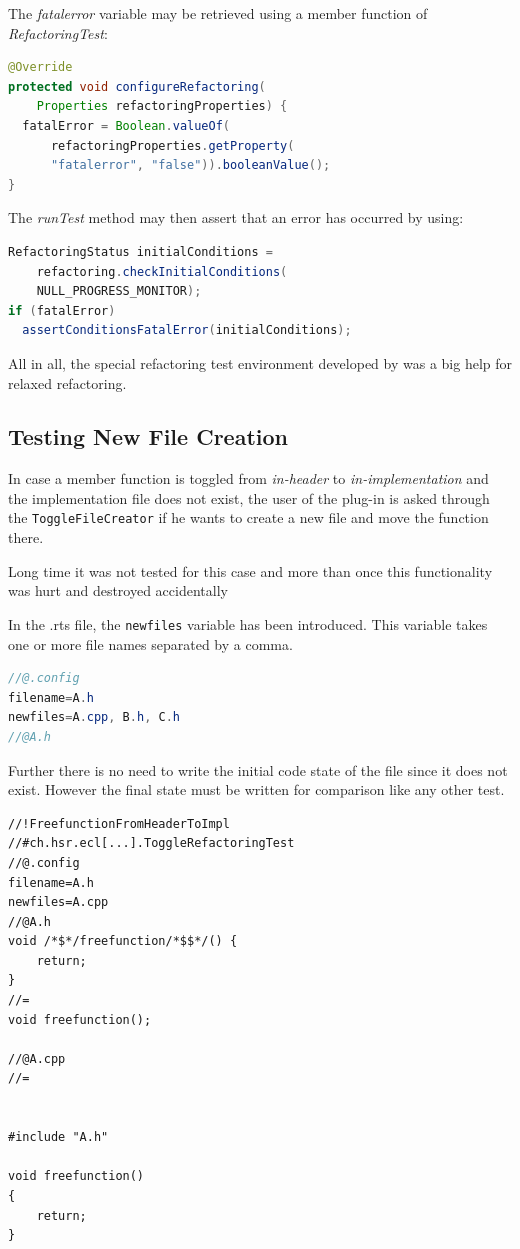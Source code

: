 The \textit{fatalerror} variable may be retrieved using a member function of \textit{RefactoringTest}:
\begin{lstlisting}[caption={Accessing a property set in the .rts file},
language=java]
@Override
protected void configureRefactoring(
    Properties refactoringProperties) {
  fatalError = Boolean.valueOf(
      refactoringProperties.getProperty(
      "fatalerror", "false")).booleanValue();
}
\end{lstlisting}

The \textit{runTest} method may then assert that an error has occurred by using:
\begin{lstlisting}[caption={Checking for errors inside the refactoring test class},language=java]
RefactoringStatus initialConditions = 
    refactoring.checkInitialConditions(
    NULL_PROGRESS_MONITOR);
if (fatalError)
  assertConditionsFatalError(initialConditions);
\end{lstlisting}

All in all, the special refactoring test environment developed by \cite{GB06} 
was a big help for relaxed refactoring.

\subsection{Testing New File Creation}

In case a member function is toggled from \textit{in-header} to
\textit{in-implementation} and the implementation file does not exist, the user
of the plug-in is asked through the \texttt{ToggleFileCreator} if he wants to
create a new file and move the function there.

Long time it was not tested for this case and more than once this functionality
was hurt and destroyed accidentally 

In the .rts file, the \texttt{newfiles} variable has been introduced. This
variable takes one or more file names separated by a comma.

\begin{lstlisting}[caption={Syntax to set variables inside a .rts file},
language=java]
//@.config
filename=A.h
newfiles=A.cpp, B.h, C.h
//@A.h
\end{lstlisting}

Further there is no need to write the initial code state of the file since it
does not exist. However the final state must be written for comparison like
any other test.

\begin{lstlisting}[caption={Writing test for newfile creation }]
//!FreefunctionFromHeaderToImpl
//#ch.hsr.ecl[...].ToggleRefactoringTest
//@.config
filename=A.h
newfiles=A.cpp
//@A.h
void /*$*/freefunction/*$$*/() {
    return;
}
//=
void freefunction();

//@A.cpp
//=


#include "A.h"

void freefunction()
{
    return;
}
\end{lstlisting}

